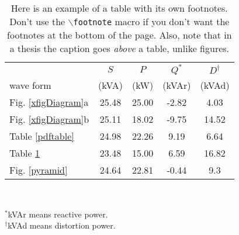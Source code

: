 \begin{table}[htb]
    \caption[Example of a table with its own footnotes]{
	Here is an example of a table with its own footnotes.
	Don't use the $\backslash${\tt footnote} macro if you
	don't want the footnotes at the bottom of the page.
	Also, note that in a thesis the caption goes
	\emph{above} a table, unlike figures.
	}
    \begin{center}
    \begin{tabular}{||l|c|c|c|c||} \hline
	& $S$ & $P$ &   $Q^{\ast}$  & $D^{\dagger}$ \\	%
	wave form & (kVA) & (kW) & (kVAr) & (kVAd) \\  \hline \hline
	Fig.  \ref{xfigDiagram}a  & 25.48 & 25.00 & -2.82 & 4.03 \\ \hline
	Fig.  \ref{xfigDiagram}b  & 25.11 & 18.02 & -9.75 & 14.52 \\ \hline
	Table \ref{pdftable}  & 24.98 & 22.26 & 9.19 & 6.64 \\ \hline
	Table \ref{powertable}  & 23.48 & 15.00 & 6.59 & 16.82 \\ \hline
	Fig.  \ref{pyramid}  & 24.64 & 22.81 & -0.44 & 9.3 \\ \hline
	\end{tabular}
   \\ \rule{0mm}{5mm}
   ${}^\ast$kVAr means reactive power.		%
\\ ${}^\dagger$kVAd means distortion power.	%
\end{center}
\label{powertable}
\end{table}


